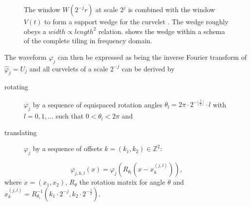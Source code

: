 \begin{figure}[h]
    \centering
    \quad
    \quad
    \quad
    \caption[Curvelet frequency windows]{
        The window $W(2^{-j}r)$ at scale $2^j$
         is combined with the
        window $V(t)$  to form a
        support wedge for the curvelet
        . The wedge roughly
        obeys a $width \propto length^2$ relation.  shows the wedge within a schema of the complete tiling in frequency domain.
    }
    \label{fig:curvelet_frequency_windows}
\end{figure}

The waveform $\varphi_j$ can then be expressed as being the inverse Fourier
transform of $\hat{\varphi}_j = U_j$ and all curvelets of a scale $2^{-j}$ can
be derived by
\begin{description}
    \item[rotating] $\varphi_j$ by a sequence of equispaced rotation angles
        $\theta_l = 2 \pi \cdot 2^{-\lfloor\frac{j}{2}\rfloor} \cdot l$ with $l
        = 0,1,\dots$ such that $0 < \theta_l < 2 \pi$ and
    \item[translating] $\varphi_j$ by a sequence of offsets $k = (k_1, k_2) \in \mathbb{Z}^2$:
\end{description}
\begin{equation} \label{eq:continuous_curvelet}
    \varphi_{j,k,l}(x) = \varphi_j(R_{\theta_l}(x - x_k^{(j,l)})),
\end{equation}
where $x = (x_1, x_2)$, $R_{\theta}$ the rotation matrix for angle $\theta$ and
$x_k^{(j,l)} = R_{\theta_l}^{-1}(k_1 \cdot 2^{-j}, k_2 \cdot
2^{-\frac{j}{2}})$.

